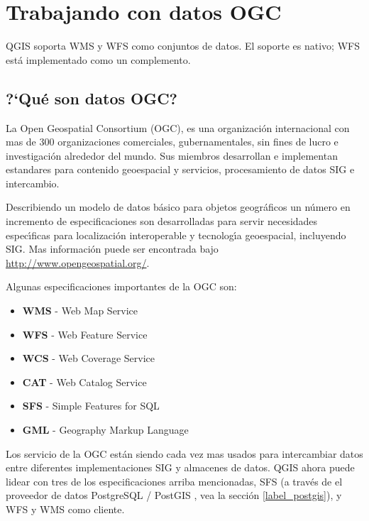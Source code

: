 ﻿%

\section{Trabajando con datos OGC}


QGIS soporta WMS y WFS como conjuntos de datos. El soporte es nativo; WFS est\'a
implementado como un complemento.

\subsection{?`Qu\'e son datos OGC?}

La Open Geospatial Consortium (OGC), es una organizaci\'on internacional con mas de 300 
organizaciones comerciales, gubernamentales, sin fines de lucro e investigaci\'on  alrededor del mundo. Sus miembros 
desarrollan e implementan estandares para contenido geoespacial y servicios, procesamiento de datos SIG 
e intercambio.

Describiendo un modelo de datos b\'asico para objetos geogr\'aficos un n\'umero en incremento de especificaciones 
son desarrolladas para servir necesidades espec\'{\i}ficas para localizaci\'on interoperable y tecnolog\'{\i}a geoespacial, 
incluyendo SIG. Mas informaci\'on puede ser encontrada bajo \url{http://www.opengeospatial.org/}.

Algunas especificaciones importantes de la OGC son:

\begin{itemize}
\item \textbf{WMS} - Web Map Service
\item \textbf{WFS} - Web Feature Service
\item \textbf{WCS} - Web Coverage Service
\item \textbf{CAT} - Web Catalog Service
\item \textbf{SFS} - Simple Features for SQL
\item \textbf{GML} - Geography Markup Language
\end{itemize}

Los servicio de la OGC est\'an siendo cada vez mas usados para intercambiar datos entre
diferentes implementaciones SIG y almacenes de datos.  QGIS ahora puede lidear con tres de los
especificaciones arriba mencionadas, SFS (a trav\'es de el proveedor de datos PostgreSQL / PostGIS
, vea la secci\'on \ref{label_postgis}), y WFS y WMS como cliente.

